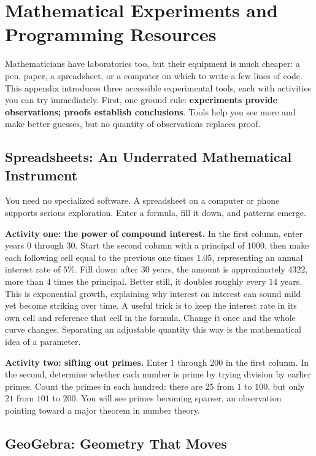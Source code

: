 \chapter{Mathematical Experiments and Programming Resources}

Mathematicians have laboratories too, but their equipment is much cheaper: a pen, paper, a spreadsheet, or a computer on which to write a few lines of code. This appendix introduces three accessible experimental tools, each with activities you can try immediately. First, one ground rule: \textbf{experiments provide observations; proofs establish conclusions}. Tools help you see more and make better guesses, but no quantity of observations replaces proof.

\section{Spreadsheets: An Underrated Mathematical Instrument}

You need no specialized software. A spreadsheet on a computer or phone supports serious exploration. Enter a formula, fill it down, and patterns emerge.

\textbf{Activity one: the power of compound interest.} In the first column, enter years $0$ through $30$. Start the second column with a principal of $1000$, then make each following cell equal to the previous one times $1.05$, representing an annual interest rate of $5\%$. Fill down: after $30$ years, the amount is approximately $4322$, more than $4$ times the principal. Better still, it doubles roughly every $14$ years. This is exponential growth, explaining why interest on interest can sound mild yet become striking over time. A useful trick is to keep the interest rate in its own cell and reference that cell in the formula. Change it once and the whole curve changes. Separating an adjustable quantity this way is the mathematical idea of a parameter.

\textbf{Activity two: sifting out primes.} Enter $1$ through $200$ in the first column. In the second, determine whether each number is prime by trying division by earlier primes. Count the primes in each hundred: there are $25$ from $1$ to $100$, but only $21$ from $101$ to $200$. You will see primes becoming sparser, an observation pointing toward a major theorem in number theory.

\section{GeoGebra: Geometry That Moves}

